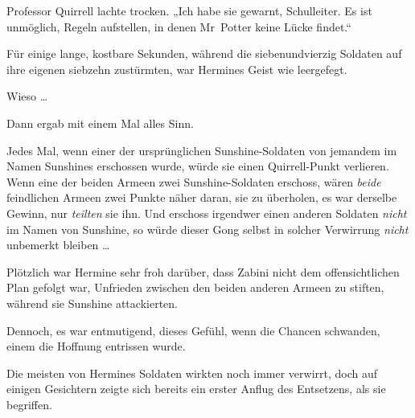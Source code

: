 Professor Quirrell lachte trocken.
„Ich habe sie gewarnt, Schulleiter. Es ist unmöglich, Regeln aufstellen, in denen Mr~Potter keine Lücke findet.“

\later

Für einige lange, kostbare Sekunden, während die siebenundvierzig Soldaten auf ihre eigenen siebzehn zustürmten, war Hermines Geist wie leergefegt.

Wieso …

Dann ergab mit einem Mal alles Sinn.

Jedes Mal, wenn einer der ursprünglichen Sunshine-Soldaten von jemandem im Namen Sunshines erschossen wurde, würde sie einen Quirrell-Punkt verlieren. Wenn eine der beiden Armeen zwei Sunshine-Soldaten erschoss, wären \emph{beide} feindlichen Armeen zwei Punkte näher daran, sie zu überholen, es war derselbe Gewinn, nur \emph{teilten} sie ihn. Und erschoss irgendwer einen anderen Soldaten \emph{nicht} im Namen von Sunshine, so würde dieser Gong selbst in solcher Verwirrung \emph{nicht} unbemerkt bleiben …

Plötzlich war Hermine sehr froh darüber, dass Zabini nicht dem offensichtlichen Plan gefolgt war, Unfrieden zwischen den beiden anderen Armeen zu stiften, während sie Sunshine attackierten.

Dennoch, es war entmutigend, dieses Gefühl, wenn die Chancen schwanden, einem die Hoffnung entrissen wurde.

Die meisten von Hermines Soldaten wirkten noch immer verwirrt, doch auf einigen Gesichtern zeigte sich bereits ein erster Anflug des Entsetzens, als sie begriffen.

